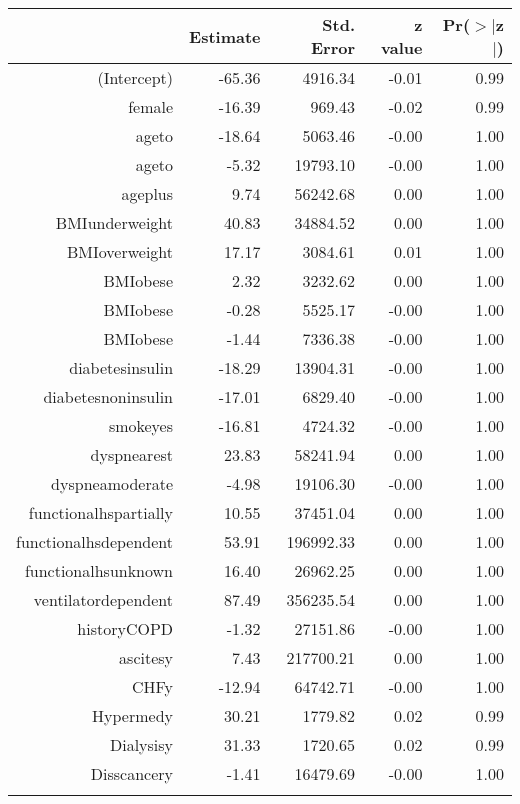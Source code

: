\bigskip\bigskip
\centering
\begin{tabular}{rrrrr}
  \hline
 & Estimate & Std. Error & z value & Pr($>$$|$z$|$) \\ 
  \hline
(Intercept) & -65.36 & 4916.34 & -0.01 & 0.99 \\ 
  female & -16.39 & 969.43 & -0.02 & 0.99 \\ 
  age\-65\-to\-74 & -18.64 & 5063.46 & -0.00 & 1.00 \\ 
  age\-75\-to\-84 & -5.32 & 19793.10 & -0.00 & 1.00 \\ 
  age\-85\-plus & 9.74 & 56242.68 & 0.00 & 1.00 \\ 
  BMI\-underweight & 40.83 & 34884.52 & 0.00 & 1.00 \\ 
  BMI\-overweight & 17.17 & 3084.61 & 0.01 & 1.00 \\ 
  BMI\-obese\-1 & 2.32 & 3232.62 & 0.00 & 1.00 \\ 
  BMI\-obese\-2 & -0.28 & 5525.17 & -0.00 & 1.00 \\ 
  BMI\-obese\-3 & -1.44 & 7336.38 & -0.00 & 1.00 \\ 
  diabetes\-insulin & -18.29 & 13904.31 & -0.00 & 1.00 \\ 
  diabetes\-noninsulin & -17.01 & 6829.40 & -0.00 & 1.00 \\ 
  smoke\-yes & -16.81 & 4724.32 & -0.00 & 1.00 \\ 
  dyspnea\-rest & 23.83 & 58241.94 & 0.00 & 1.00 \\ 
  dyspnea\-moderate & -4.98 & 19106.30 & -0.00 & 1.00 \\ 
  functional\-hs\-partially & 10.55 & 37451.04 & 0.00 & 1.00 \\ 
  functional\-hs\-dependent & 53.91 & 196992.33 & 0.00 & 1.00 \\ 
  functional\-hs\-unknown & 16.40 & 26962.25 & 0.00 & 1.00 \\ 
  ventilator\-dependent & 87.49 & 356235.54 & 0.00 & 1.00 \\ 
  history\-COPD & -1.32 & 27151.86 & -0.00 & 1.00 \\ 
  ascites\-y & 7.43 & 217700.21 & 0.00 & 1.00 \\ 
  CHF\-y & -12.94 & 64742.71 & -0.00 & 1.00 \\ 
  Hyper\-med\-y & 30.21 & 1779.82 & 0.02 & 0.99 \\ 
  Dialysis\-y & 31.33 & 1720.65 & 0.02 & 0.99 \\ 
  Diss\-cancer\-y & -1.41 & 16479.69 & -0.00 & 1.00 \\ 
$$
\end{tabular}
